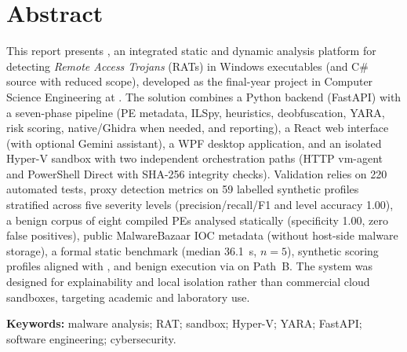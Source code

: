 \chapter*{Abstract}

This report presents \rat{}, an integrated static and dynamic analysis platform for detecting
\emph{Remote Access Trojans} (RATs) in Windows executables (and C\# source with reduced scope),
developed as the final-year project in Computer Science Engineering at \ubi{}. The solution
combines a Python backend (FastAPI) with a seven-phase pipeline (PE metadata, ILSpy, heuristics,
deobfuscation, YARA, risk scoring, native/Ghidra when needed, and reporting), a React web
interface (with optional Gemini assistant), a WPF desktop application, and an isolated
Hyper-V sandbox with two independent orchestration paths (HTTP vm-agent and PowerShell Direct
with SHA-256 integrity checks). Validation relies on 220 automated tests, proxy detection
metrics on 59 labelled synthetic profiles stratified across five severity levels
(precision/recall/F1 and level accuracy 1.00), a benign corpus of eight compiled
PEs analysed statically (specificity 1.00, zero false positives), public MalwareBazaar IOC metadata
(without host-side malware storage), a formal static benchmark (median 36.1~s, $n=5$), synthetic scoring profiles aligned with
, and benign execution via  on
Path~B. The system was designed for explainability and local isolation rather than commercial cloud
sandboxes, targeting academic and laboratory use.

\vspace{0.8em}
\noindent\textbf{Keywords:} malware analysis; RAT; sandbox; Hyper-V; YARA; FastAPI;
software engineering; cybersecurity.
